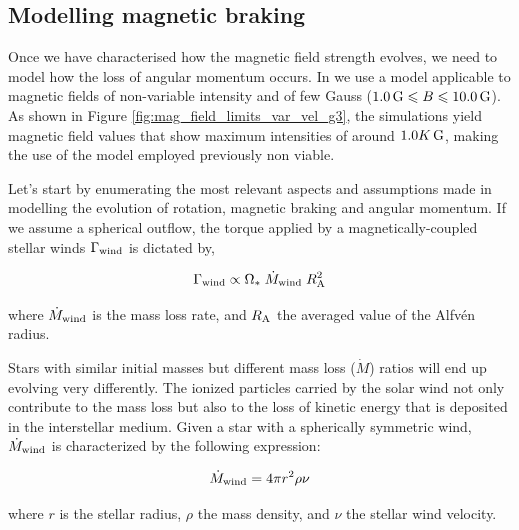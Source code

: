 \documentclass[fleqn,usenatbib]{mnras}
\begin{document}
\subsection{Modelling magnetic braking} \label{mod_mb}
Once we have characterised how the magnetic field strength evolves, we need to model how the loss of angular momentum occurs.  In \cite{Navarro2020} we use a model applicable to magnetic fields of non-variable intensity and of few Gauss ($1.0\,\mathrm{G} \leqslant B \leqslant 10.0\,\mathrm{G}$). As shown in Figure \ref{fig:mag_field_limits_var_vel_g3}, the simulations yield magnetic field values that show maximum intensities of around $1.0K\,\mathrm{G}$, making the use of the model employed previously non viable.

Let's start by enumerating the most relevant aspects and assumptions made in modelling the evolution of rotation, magnetic braking and angular momentum. If we assume a spherical outflow, the torque applied by a magnetically-coupled stellar winds $\Gamma_{\mathrm{wind}}$ is dictated by,
\begin{ceqn}
\begin{equation}
    \Gamma_{\mathrm{wind}} \propto \Omega_* \; \Dot{M}_{\mathrm{wind}} \; R_{\mathrm{A}}^{2} \label{eq:mb_torque}
\end{equation}
\end{ceqn}
where $\Dot{M}_{\mathrm{wind}}$ is the mass loss rate, and $R_{\mathrm{A}}$ the averaged value of the Alfvén radius.\par
Stars with similar initial masses but different mass loss ($\Dot{M}$) ratios will end up evolving very differently. The ionized particles carried by the solar wind not only contribute to the mass loss but also to the loss of kinetic energy that is deposited in the interstellar medium. Given a star with a spherically symmetric wind, $\Dot{M}_{\mathrm{wind}}$ is characterized by the following expression:

\begin{ceqn}
\begin{equation}
    \Dot{M}_{\mathrm{wind}} = 4\pi r^2\rho\nu \label{eq:mass_loss}
\end{equation}
\end{ceqn}
where $r$ is the stellar radius, $\rho$ the mass density, and $\nu$ the stellar wind velocity.
\end{document}
